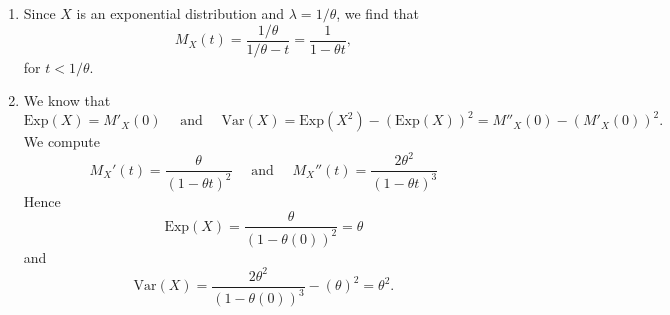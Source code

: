 \begin{problem}
    \begin{enumerate}[label=\alph*)]
        \item Since $X$ is an exponential distribution and $\lambda = 1/\theta$, we find that
            \[
                M_X (t) = \frac{1/\theta}{1/\theta - t} = \frac{1}{1 - \theta t} , 
            \]
        for $t < 1/\theta$.
        \item We know that
            \[
                \mathrm{Exp} (X) = M'_X (0) \quad \text{ and } \quad \mathrm{Var} (X) = \mathrm{Exp} (X^2) - (\mathrm{Exp} (X))^2 = M''_X (0) - (M'_X(0))^2 .
            \]
        We compute
            \[
                M_X' (t) = \frac{\theta}{(1 - \theta t)^2} \quad \text{ and } \quad M_X'' (t) = \frac{2\theta^2}{(1 - \theta t)^{3}}
            \]
        Hence
            \[
                \mathrm{Exp} (X) = \frac{\theta}{(1 - \theta (0))^2} = \theta
            \]
        and
            \[
                \mathrm{Var} (X) = \frac{2\theta^2}{(1 - \theta (0))^3} - (\theta)^2 = \theta^2 . \tag*{$\triangle$}
            \]
    \end{enumerate}
\end{problem}

